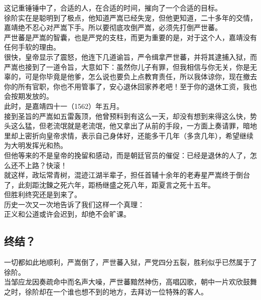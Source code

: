 \begin{multicols}{\theparacolNo}
这记重锤锤中了，合适的人，在合适的时间，摧向了一个合适的目标。\\

徐阶实在是聪明到了极点，他知道严嵩已经失宠，但他更知道，二十多年的交情，嘉靖绝不忍心对严嵩下手。所以要彻底攻倒严嵩，必须先打倒严世蕃。\\

严世蕃是严嵩的智囊，也是严党的支柱，而更为重要的是，对于这个人，嘉靖没有任何手软的理由。\\

很快，皇帝显示了震怒，他连下几道谕旨，严令缉拿严世蕃，并将其逮捕入狱，而严嵩也接到了一道令旨，大意如下：虽然你儿子有罪，但我相信与你无关，你是无辜的，可是你毕竟是他爹，怎么说也要负上点教育责任，所以我体谅你，现在撤去你的所有官职，你也不用管事了，安心退休回家养老吧！至于你的退休工资，我也会按期发放的。\\

此时，是嘉靖四十一（1562）年五月。\\

接到圣旨的严嵩如五雷轰顶，他曾预料到有这么一天，却没有想到来得这么快，势头这么猛，但老流氓就是老流氓，他又拿出了从前的手段，一方面上奏请罪，暗地里却上密折向皇帝求情，表示自己身体好，还能多干几年（多贪几年），希望继续为大明发挥光和热。\\

但他等来的不是皇帝的挽留和感动，而是朝廷官员的催促：已经是退休的人了，怎么还不上路？快滚！\\

就这样，政坛常青树，混迹江湖半辈子，担任首辅十余年的老寿星严嵩终于倒台了，此刻距沈鍊之死六年，距杨继盛之死八年，距夏言之死十五年。\\

但胜利终究还是到来了。\\

历史一次又一次地告诉了我们这样一个真理：\\

正义和公道或许会迟到，却绝不会旷课。\\

\subsection{终结？}
一切都如此地顺利，严嵩倒了，严世蕃入狱，严党四分五裂，胜利似乎已然属于了徐阶。\\

当邹应龙因奏疏命中而名声大噪，严世蕃黯然神伤，高唱囚歌，朝中一片欢欣鼓舞之时，徐阶却在一个谁也想不到的地方，去拜访一位特殊的客人。\\


\end{multicols}
